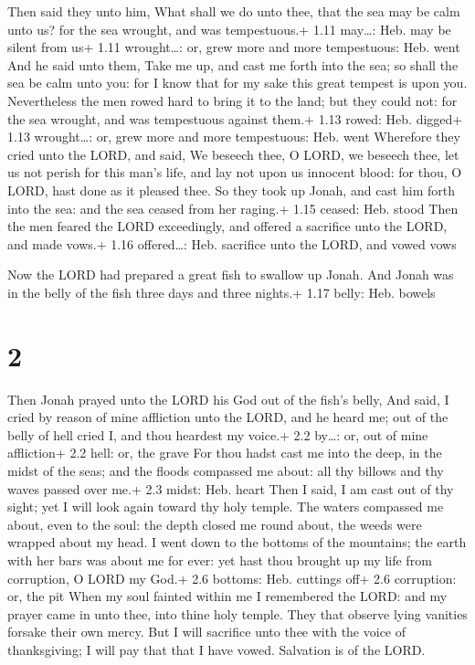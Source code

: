  Then said they unto him, What shall we do unto thee,
that the sea may be calm unto us? for the sea wrought, and was
tempestuous.+ 1.11 may\ldots: Heb. may be silent from us+ 1.11
wrought\ldots: or, grew more and more tempestuous: Heb. went
 And he said unto them, Take me up, and cast me forth into
the sea; so shall the sea be calm unto you: for I know that for my sake
this great tempest is upon you.  Nevertheless the men rowed
hard to bring it to the land; but they could not: for the sea wrought,
and was tempestuous against them.+ 1.13 rowed: Heb. digged+ 1.13
wrought\ldots: or, grew more and more tempestuous: Heb. went
 Wherefore they cried unto the LORD, and said, We beseech
thee, O LORD, we beseech thee, let us not perish for this man's life,
and lay not upon us innocent blood: for thou, O LORD, hast done as it
pleased thee.  So they took up Jonah, and cast him forth
into the sea: and the sea ceased from her raging.+ 1.15 ceased: Heb.
stood  Then the men feared the LORD exceedingly, and
offered a sacrifice unto the LORD, and made vows.+ 1.16 offered\ldots:
Heb. sacrifice unto the LORD, and vowed vows

 Now the LORD had prepared a great fish to swallow up
Jonah. And Jonah was in the belly of the fish three days and three
nights.+ 1.17 belly: Heb. bowels

\hypertarget{section-1}{%
\section{2}\label{section-1}}

 Then Jonah prayed unto the LORD his God out of the fish's
belly,  And said, I cried by reason of mine affliction unto
the LORD, and he heard me; out of the belly of hell cried I, and thou
heardest my voice.+ 2.2 by\ldots: or, out of mine affliction+ 2.2 hell:
or, the grave  For thou hadst cast me into the deep, in the
midst of the seas; and the floods compassed me about: all thy billows
and thy waves passed over me.+ 2.3 midst: Heb. heart  Then I
said, I am cast out of thy sight; yet I will look again toward thy holy
temple.  The waters compassed me about, even to the soul:
the depth closed me round about, the weeds were wrapped about my head.
 I went down to the bottoms of the mountains; the earth with
her bars was about me for ever: yet hast thou brought up my life from
corruption, O LORD my God.+ 2.6 bottoms: Heb. cuttings off+ 2.6
corruption: or, the pit  When my soul fainted within me I
remembered the LORD: and my prayer came in unto thee, into thine holy
temple.  They that observe lying vanities forsake their own
mercy.  But I will sacrifice unto thee with the voice of
thanksgiving; I will pay that that I have vowed. Salvation is of the
LORD.

